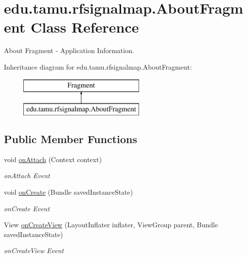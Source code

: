 \hypertarget{classedu_1_1tamu_1_1rfsignalmap_1_1_about_fragment}{}\section{edu.\+tamu.\+rfsignalmap.\+About\+Fragment Class Reference}
\label{classedu_1_1tamu_1_1rfsignalmap_1_1_about_fragment}


About Fragment -\/ Application Information.  


Inheritance diagram for edu.\+tamu.\+rfsignalmap.\+About\+Fragment\+:\begin{figure}[H]
\begin{center}
\leavevmode
\includegraphics[height=2.000000cm]{classedu_1_1tamu_1_1rfsignalmap_1_1_about_fragment}
\end{center}
\end{figure}
\subsection*{Public Member Functions}
\begin{DoxyCompactItemize}
\item 
void \hyperlink{classedu_1_1tamu_1_1rfsignalmap_1_1_about_fragment_a96b482afac13b664ff351e53633e92af}{on\+Attach} (Context context)
\begin{DoxyCompactList}\small\item\em on\+Attach Event \end{DoxyCompactList}\item 
void \hyperlink{classedu_1_1tamu_1_1rfsignalmap_1_1_about_fragment_a09fd87b64d1d2eea3bc955173fa58308}{on\+Create} (Bundle saved\+Instance\+State)
\begin{DoxyCompactList}\small\item\em on\+Create Event \end{DoxyCompactList}\item 
View \hyperlink{classedu_1_1tamu_1_1rfsignalmap_1_1_about_fragment_aab20df5b3b34cf4f1795f05ec866ee6c}{on\+Create\+View} (Layout\+Inflater inflater, View\+Group parent, Bundle saved\+Instance\+State)
\begin{DoxyCompactList}\small\item\em on\+Create\+View Event \end{DoxyCompactList}\end{DoxyCompactItemize}



